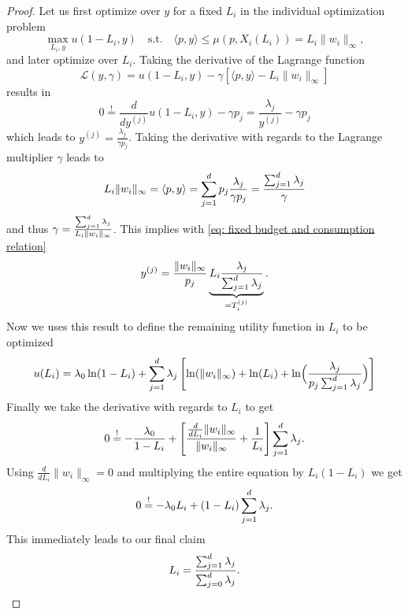 \begin{proof}
	Let us first optimize over \(y\) for a fixed \(L_i\) in the individual
	optimization problem
	\[
		\max_{L_i, y} u(1-L_i, y)
		\quad \text{s.t.}\quad
		\langle p, y\rangle \le \mu(p, X_i(L_i)) = L_i \|w_i\|_\infty,
	\]
	and later optimize over \(L_i\). Taking the derivative of the Lagrange
	function
	\[
		\mathcal{L}	(y, \gamma)
		= u(1-L_i, y) - \gamma [\langle p, y\rangle - L_i\|w_i\|_\infty]
	\]
	results in
	\[
		0\overset!= \frac{d}{d y^{(j)}}u(1-L_i,y) - \gamma p_j
		= \frac{\lambda_j}{y^{(j)}} - \gamma p_j
	\]
	which leads to \(y^{(j)} = \frac{\lambda_j}{\gamma p_j}\). Taking the
	derivative with regards to the Lagrange multiplier \(\gamma\) leads to
	\[
		L_i\|w_i\|_\infty = \langle p, y\rangle
		= \sum_{j=1}^d p_j \frac{\lambda_j}{\gamma p_j}
		= \frac{\sum_{j=1}^d \lambda_j}\gamma
	\]
	and thus \(\gamma = \frac{\sum_{j=1}^d \lambda_j}{L_i\|w_i\|_\infty}\).
	This implies with \eqref{eq: fixed budget and consumption relation}
	\[
		y^{(j)}
		= \frac{\|w_i\|_\infty}{p_j}
		\underbrace{L_i\frac{\lambda_j}{\sum_{j=1}^d \lambda_j}}_{=T_i^{(j)}}.
	\]
	Now we uses this result to define the remaining utility function in \(L_i\) 
	to be optimized
	\[
		u(L_i) = \lambda_0 \ln(1-L_i) + \sum_{j=1}^d \lambda_j \left[
			\ln(\|w_i\|_\infty) + \ln(L_i) + \ln\Bigl(\frac{\lambda_j}{p_j\sum_{j=1}^d \lambda_j}\Bigr)
		\right]
	\]
	Finally we take the derivative with regards to \(L_i\) to get
	\[
		0\overset!= -\frac{\lambda_0}{1-L_i}
		+ \left[
			\frac{\frac{d}{dL_i}\|w_i\|_\infty}{\|w_i\|_\infty}
			+ \frac1{L_i}
		\right]\sum_{j=1}^d \lambda_j.
	\]
	Using \(\frac{d}{dL_i}\|w_i\|_\infty = 0\) 
	and multiplying the entire equation by \(L_i(1-L_i)\) we get
	\[
		0\overset!= -\lambda_0L_i + (1-L_i)\sum_{j=1}^d \lambda_j.
	\]
	This immediately leads to our final claim
	\[
		L_i = \frac{\sum_{j=1}^d \lambda_j}{\sum_{j=0}^d \lambda_j}.
		\qedhere
	\]
\end{proof}
